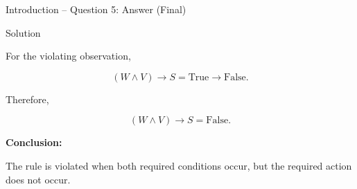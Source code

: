 \begin{frame}{Introduction -- Question 5: Answer (Final)}

\begin{exampleblock}{Solution}

For the violating observation,

\[
(W\land V)\rightarrow S
=
\mathrm{True}\rightarrow\mathrm{False}.
\]

Therefore,

\[
(W\land V)\rightarrow S=\mathrm{False}.
\]

\medskip

\textbf{Conclusion:}

The rule is violated when both required conditions occur, but the required
action does not occur.

\end{exampleblock}

\end{frame}


